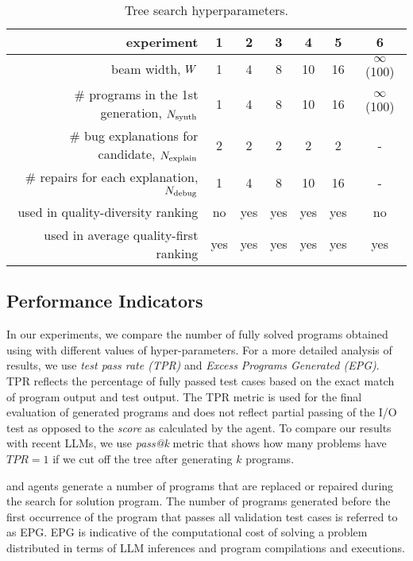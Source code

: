 \begin{table}
    \centering
    \caption{Tree search hyperparameters.}\small
    \label{tab:w-n}\vspace*{-4mm}
    \begin{tabular}{rcccccc}
    \toprule
    experiment & 1 & 2 & 3 & 4 & 5 & 6 \\
    \midrule
     beam width, $W{}$ & 1 & 4 & 8 & 10 & 16 & $\infty$ (100) \\
     \# programs in the 1st generation, $N_\text{synth}{}$ & 1 & 4 & 8 & 10 & 16 & $\infty$ (100) \\
     \# bug explanations for candidate, $N_\text{explain}{}$ & 2 & 2 & 2 & 2 & 2 & - \\
     \# repairs for each explanation, $N_\text{debug}{}$ & 1 & 4 & 8 & 10 & 16 & - \\
     \midrule
     used in quality-diversity ranking & 
     no & yes & yes & yes & yes & no \\
     used in average quality-first ranking  & 
     yes & yes & yes & yes & yes & yes \\
     \bottomrule
    \end{tabular}
\end{table}



\subsection{Performance Indicators}
\label{sec:metrics}

\sloppy %
In our experiments, we compare 
the number of fully solved programs obtained using \method{} with different values of hyper-parameters. 
For a more detailed analysis of results, we use \emph{test pass rate (TPR)} and \emph{Excess Programs Generated (EPG)}.
TPR reflects the percentage of fully passed test cases based on the exact match of program output and test output. 
The TPR metric is used for the final evaluation of generated programs and does not reflect partial passing of the I/O test as opposed to the \emph{score} as calculated by the \rank{} agent. 
To compare our results with recent LLMs, we use \emph{pass@k} metric that shows how many problems have $TPR=1$ if we cut off the tree after generating $k$ programs. 

\debug{} and \execute{} agents generate a number of programs that are replaced or repaired during the search for solution program. 
The number of programs generated before the first occurrence of the program that passes all validation test cases is referred to as EPG. 
EPG is indicative of the computational cost of solving a problem distributed in terms of LLM inferences and program compilations and executions.

